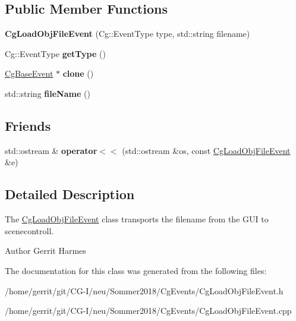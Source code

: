 \subsection*{Public Member Functions}
\begin{DoxyCompactItemize}
\item 
\mbox{\label{class_cg_load_obj_file_event_a9692cb4eedfaf6832cf98c2ddd574f42}} 
{\bfseries Cg\+Load\+Obj\+File\+Event} (Cg\+::\+Event\+Type type, std\+::string filename)
\item 
\mbox{\label{class_cg_load_obj_file_event_a4841ea583354387b69a10c17244dd137}} 
Cg\+::\+Event\+Type {\bfseries get\+Type} ()
\item 
\mbox{\label{class_cg_load_obj_file_event_acd1188e584b0ae79a252396728ac3bd8}} 
\hyperlink{class_cg_base_event}{Cg\+Base\+Event} $\ast$ {\bfseries clone} ()
\item 
\mbox{\label{class_cg_load_obj_file_event_ac8bccd76909e8576ecf217942672b11d}} 
std\+::string {\bfseries file\+Name} ()
\end{DoxyCompactItemize}
\subsection*{Friends}
\begin{DoxyCompactItemize}
\item 
\mbox{\label{class_cg_load_obj_file_event_a7ed0ca2cebc74730d4ba259ebc3c40fb}} 
std\+::ostream \& {\bfseries operator$<$$<$} (std\+::ostream \&os, const \hyperlink{class_cg_load_obj_file_event}{Cg\+Load\+Obj\+File\+Event} \&e)
\end{DoxyCompactItemize}


\subsection{Detailed Description}
The \hyperlink{class_cg_load_obj_file_event}{Cg\+Load\+Obj\+File\+Event} class transports the filename from the G\+UI to scenecontroll. 

\begin{DoxyAuthor}{Author}
Gerrit Harmes 
\end{DoxyAuthor}


The documentation for this class was generated from the following files\+:\begin{DoxyCompactItemize}
\item 
/home/gerrit/git/\+C\+G-\/\+I/neu/\+Sommer2018/\+Cg\+Events/Cg\+Load\+Obj\+File\+Event.\+h\item 
/home/gerrit/git/\+C\+G-\/\+I/neu/\+Sommer2018/\+Cg\+Events/Cg\+Load\+Obj\+File\+Event.\+cpp\end{DoxyCompactItemize}
